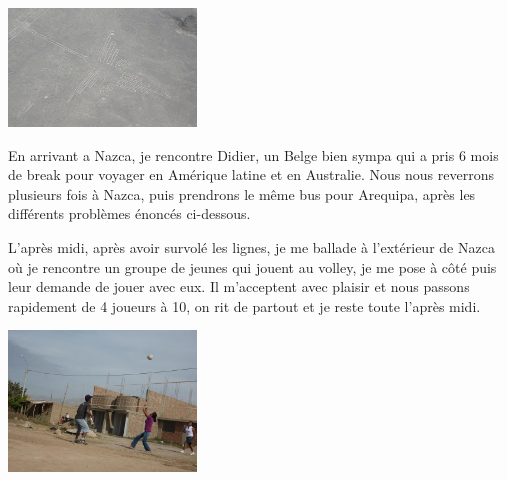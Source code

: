 \begin{multicols}{2}
\smallbreak
\hspace*{-0.65cm}
\includegraphics[width=5cm]{articles/Cote-du-sud/1255996046TE4T.jpg}
\smallbreak

En arrivant a Nazca, je rencontre Didier, un Belge bien sympa qui a pris 6 mois de break pour voyager en Amérique latine et en Australie.  Nous nous reverrons plusieurs fois à Nazca, puis prendrons le même bus pour Arequipa, après les différents problèmes énoncés ci-dessous.

L'après midi, après avoir survolé les lignes, je me ballade à l'extérieur de Nazca où je rencontre un groupe de jeunes qui jouent au volley, je me pose à côté puis leur demande de jouer avec eux. Il m'acceptent avec plaisir et nous passons rapidement de 4 joueurs à 10, on rit de partout et je reste toute l'après midi.

\smallbreak
\hspace*{-0.65cm}
\includegraphics[width=5cm]{articles/Cote-du-sud/1255996043Enc7.jpg}
\smallbreak


\end{multicols}
